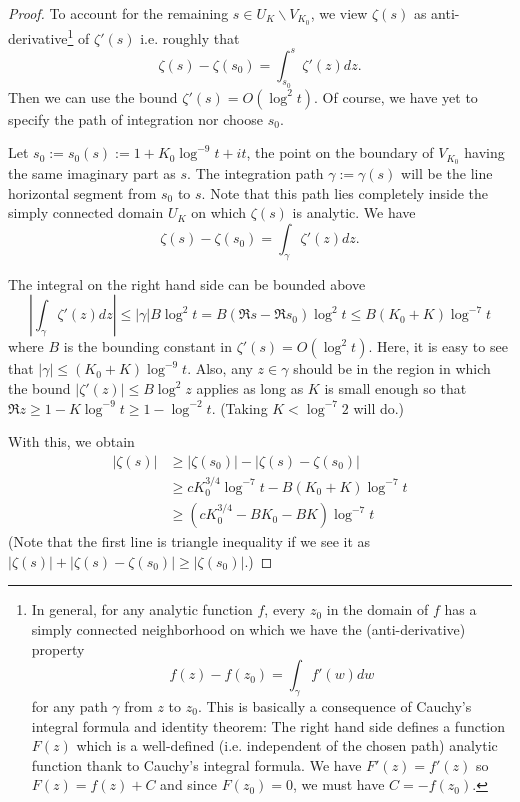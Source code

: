 \documentclass[12pt]{article}
\newcommand{\Abs}[1]{\left| #1 \right|}
\begin{document}
\begin{proof}
To account for the remaining $s \in U_K \backslash V_{K_0}$, we view $\zeta(s)$ as anti-derivative\footnote{In general, for any analytic function $f$, every $z_0$ in the domain of $f$ has a simply connected neighborhood on which we have the (anti-derivative) property
$$f(z) - f(z_0) = \int_\gamma f'(w) dw$$
for any path $\gamma$ from $z$ to $z_0$. This is basically a consequence of Cauchy's integral formula and identity theorem: The right hand side defines a function $F(z)$ which is a well-defined (i.e. independent of the chosen path) analytic function thank to Cauchy's integral formula. We have $F'(z) = f'(z)$ so $F(z) = f(z) + C$ and since $F(z_0) = 0$, we must have $C = -f(z_0)$.} of $\zeta'(s)$ i.e. roughly that
$$\zeta(s) - \zeta(s_0) = \int_{s_0}^{s} \zeta'(z) dz.$$
Then we can use the bound $\zeta'(s) = O(\log^2 t)$. Of course, we have yet to specify the path of integration nor choose $s_0$.

Let $s_0 := s_0(s) := 1 + K_0 \log^{-9} t + i t$, the point on the boundary of $V_{K_0}$ having the same imaginary part as $s$. The integration path $\gamma := \gamma(s)$ will be the line horizontal segment from $s_0$ to $s$. Note that this path lies completely inside the simply connected domain $U_K$ on which $\zeta(s)$ is analytic. We have
$$\zeta(s) - \zeta(s_0) = \int_{\gamma} \zeta'(z) dz.$$

The integral on the right hand side can be bounded above
$$\Abs{ \int_{\gamma} \zeta'(z) dz } \leq |\gamma| B \log^2 t = B (\Re s - \Re s_0) \log^2 t \leq B (K_0 + K) \log^{-7} t$$
where $B$ is the bounding constant in $\zeta'(s) = O(\log^2 t)$. Here, it is easy to see that $|\gamma| \leq (K_0 + K) \log^{-9} t$. Also, any $z \in \gamma$ should be in the region in which the bound $|\zeta'(z)| \leq B \log^2 z$ applies as long as $K$ is small enough so that $\Re z \geq 1 - K \log^{-9} t \geq 1 - \log^{-2} t$. (Taking $K < \log^{-7} 2$ will do.)

With this, we obtain
\begin{align*}
\Abs{ \zeta(s) } &\geq \Abs{\zeta(s_0)} - \Abs{ \zeta(s) - \zeta(s_0) }\\
&\geq cK_0^{3/4} \log^{-7} t - B (K_0 + K) \log^{-7} t\\
&\geq (cK_0^{3/4} - B K_0 - B K) \log^{-7} t
\end{align*}
(Note that the first line is triangle inequality if we see it as $\Abs{ \zeta(s) } + \Abs{ \zeta(s) - \zeta(s_0) } \geq \Abs{\zeta(s_0)}$.)


\end{proof}
\end{document}

